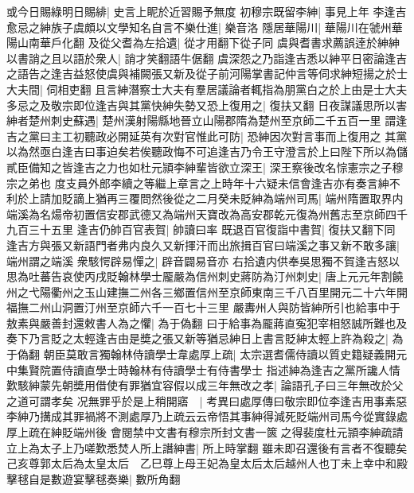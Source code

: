 或今日賜綠明日賜緋|{
	史言上眤於近習賜予無度}
初穆宗既留李紳|{
	事見上年}
李逢吉愈忌之紳族子虞頗以文學知名自言不樂仕進|{
	樂音洛}
隱居華陽川|{
	華陽川在虢州華陽山南華戶化翻}
及從父耆為左拾遺|{
	從才用翻下從子同}
虞與耆書求薦誤逹於紳紳以書誚之且以語於衆人|{
	誚才笑翻語牛倨翻}
虞深怨之乃詣逢吉悉以紳平日密論逢吉之語告之逢吉益怒使虞與補闕張又新及從子前河陽掌書記仲言等伺求紳短揚之於士大夫間|{
	伺相吏翻}
且言紳潛察士大夫有羣居議論者輒指為朋黨白之於上由是士大夫多忌之及敬宗即位逢吉與其黨快紳失勢又恐上復用之|{
	復扶又翻}
日夜謀議思所以害紳者楚州刺史蘇遇|{
	楚州漢射陽縣地晉立山陽郡隋為楚州至京師二千五百一里}
謂逢吉之黨曰主工初聽政必開延英有次對官惟此可防|{
	恐紳因次對言事而上復用之}
其黨以為然亟白逢吉曰事迫矣若俟聽政悔不可追逢吉乃令王守澄言於上曰陛下所以為儲貳臣備知之皆逢吉之力也如杜元頴李紳輩皆欲立深王|{
	深王察後改名悰憲宗之子穆宗之弟也}
度支員外郎李續之等繼上章言之上時年十六疑未信會逢吉亦有奏言紳不利於上請加貶謫上猶再三覆問然後從之二月癸未貶紳為端州司馬|{
	端州隋置取界内端溪為名煬帝初置信安郡武德又為端州天寶改為高安郡乾元復為州舊志至京師四千九百三十五里}
逢吉仍帥百官表賀|{
	帥讀曰率}
既退百官復詣中書賀|{
	復扶又翻下同}
逢吉方與張又新語門者弗内良久又新揮汗而出旅揖百官曰端溪之事又新不敢多讓|{
	端州謂之端溪}
衆駭愕辟易憚之|{
	辟音闢易音亦}
右拾遺内供奉吳思獨不賀逢吉怒以思為吐蕃告哀使丙戌貶翰林學士龎嚴為信州刺史蔣防為汀州刺史|{
	唐上元元年割饒州之弋陽衢州之玉山建撫二州各三鄉置信州至京師東南三千八百里開元二十六年開福撫二州山洞置汀州至京師六千一百七十三里}
嚴夀州人與防皆紳所引也給事中于敖素與嚴善封還敕書人為之懼|{
	為于偽翻}
曰于給事為龎蔣直寃犯宰相怒誠所難也及奏下乃言貶之太輕逢吉由是奬之張又新等猶忌紳日上書言貶紳太輕上許為殺之|{
	為于偽翻}
朝臣莫敢言獨翰林侍讀學士韋處厚上疏|{
	太宗選耆儒侍讀以質史籍疑義開元中集賢院置侍讀直學士時翰林有侍讀學士有侍書學士}
指述紳為逢吉之黨所讒人情歎駭紳蒙先朝奬用借使有罪猶宜容假以成三年無改之孝|{
	論語孔子曰三年無改於父之道可謂孝矣}
况無罪乎於是上稍開寤　|{
	考異曰處厚傳曰敬宗即位李逢吉用事素惡李紳乃搆成其罪禍將不測處厚乃上疏云云帝悟其事紳得減死貶端州司馬今從實錄處厚上疏在紳貶端州後}
會閱禁中文書有穆宗所封文書一篋之得裴度杜元頴李紳疏請立上為太子上乃嗟歎悉焚人所上譖紳書|{
	所上時掌翻}
雖未即召還後有言者不復聽矣　己亥尊郭太后為太皇太后　乙巳尊上母王妃為皇太后太后越州人也丁未上幸中和殿擊毬自是數遊宴擊毬奏樂|{
	數所角翻}


